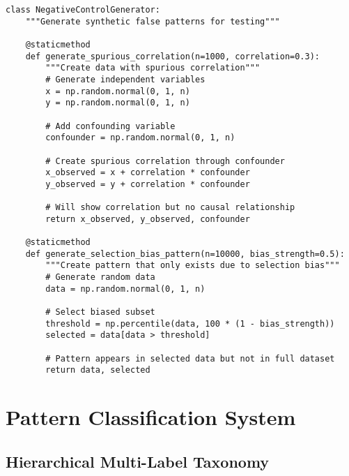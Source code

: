 \documentclass[12pt,oneside]{memoir}
\theoremstyle{plain}
\theoremstyle{definition}
\theoremstyle{remark}
\begin{document}
\begin{lstlisting}[caption={Generate Calibration Patterns}]
class NegativeControlGenerator:
    """Generate synthetic false patterns for testing"""
    
    @staticmethod
    def generate_spurious_correlation(n=1000, correlation=0.3):
        """Create data with spurious correlation"""
        # Generate independent variables
        x = np.random.normal(0, 1, n)
        y = np.random.normal(0, 1, n)
        
        # Add confounding variable
        confounder = np.random.normal(0, 1, n)
        
        # Create spurious correlation through confounder
        x_observed = x + correlation * confounder
        y_observed = y + correlation * confounder
        
        # Will show correlation but no causal relationship
        return x_observed, y_observed, confounder
    
    @staticmethod
    def generate_selection_bias_pattern(n=10000, bias_strength=0.5):
        """Create pattern that only exists due to selection bias"""
        # Generate random data
        data = np.random.normal(0, 1, n)
        
        # Select biased subset
        threshold = np.percentile(data, 100 * (1 - bias_strength))
        selected = data[data > threshold]
        
        # Pattern appears in selected data but not in full dataset
        return data, selected
\end{lstlisting}

\chapter{Pattern Classification System}

\section{Hierarchical Multi-Label Taxonomy}
\end{document}
